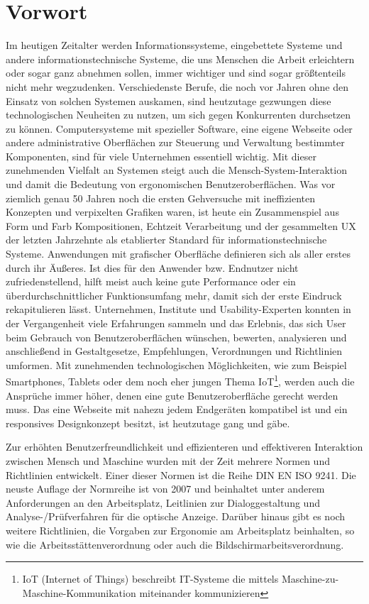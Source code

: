 \section{Vorwort}

Im heutigen Zeitalter werden Informationssysteme, eingebettete Systeme und andere informationstechnische Systeme, die uns Menschen die Arbeit erleichtern oder sogar ganz abnehmen sollen, immer wichtiger und sind sogar größtenteils nicht mehr wegzudenken. Verschiedenste Berufe, die noch vor Jahren ohne den Einsatz von solchen Systemen auskamen, sind heutzutage gezwungen diese technologischen Neuheiten zu nutzen, um sich gegen Konkurrenten durchsetzen zu können. Computersysteme mit spezieller Software, eine eigene Webseite oder andere administrative Oberflächen zur Steuerung und Verwaltung bestimmter Komponenten, sind für viele Unternehmen essentiell wichtig. Mit dieser zunehmenden Vielfalt an Systemen steigt auch die Mensch-System-Interaktion und damit die Bedeutung von ergonomischen Benutzeroberflächen. Was vor ziemlich genau 50 Jahren noch die ersten Gehversuche mit ineffizienten Konzepten und verpixelten Grafiken waren, ist heute ein Zusammenspiel aus Form und Farb Kompositionen, Echtzeit Verarbeitung und der gesammelten UX der letzten Jahrzehnte als etablierter Standard für informationstechnische Systeme. Anwendungen mit grafischer Oberfläche definieren sich als aller erstes durch ihr Äußeres. Ist dies für den Anwender bzw. Endnutzer nicht zufriedenstellend, hilft meist auch keine gute Performance oder ein überdurchschnittlicher Funktionsumfang mehr, damit sich der erste Eindruck rekapitulieren lässt. Unternehmen, Institute und Usability-Experten konnten in der Vergangenheit viele Erfahrungen sammeln und das Erlebnis, das sich User beim Gebrauch von Benutzeroberflächen wünschen, bewerten, analysieren und anschließend in Gestaltgesetze, Empfehlungen, Verordnungen und Richtlinien umformen. Mit zunehmenden technologischen Möglichkeiten, wie zum Beispiel Smartphones, Tablets oder dem noch eher jungen Thema IoT\footnote{IoT (Internet of Things) beschreibt IT-Systeme die mittels Maschine-zu-Maschine-Kommunikation miteinander kommunizieren}, werden auch die Ansprüche immer höher, denen eine gute Benutzeroberfläche gerecht werden muss. Das eine Webseite mit nahezu jedem Endgeräten kompatibel ist und ein responsives Designkonzept besitzt, ist heutzutage gang und gäbe.

Zur erhöhten Benutzerfreundlichkeit und effizienteren und effektiveren Interaktion zwischen Mensch und Maschine wurden mit der Zeit mehrere Normen und Richtlinien entwickelt. Einer dieser Normen ist die Reihe DIN EN ISO 9241. Die neuste Auflage der Normreihe ist von 2007 und beinhaltet unter anderem Anforderungen an den Arbeitsplatz, Leitlinien zur Dialoggestaltung und Analyse-/Prüfverfahren für die optische Anzeige. Darüber hinaus gibt es noch weitere Richtlinien, die Vorgaben zur Ergonomie am Arbeitsplatz beinhalten, so wie die Arbeitsstättenverordnung oder auch die Bildschirmarbeitsverordnung.

